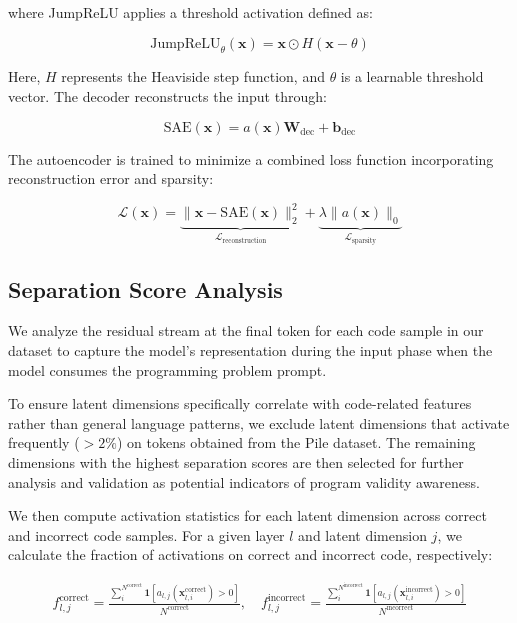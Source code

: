 where JumpReLU applies a threshold activation defined as:

\begin{equation}
    \text{JumpReLU}_\theta(\mathbf{x}) = \mathbf{x} \odot H(\mathbf{x} - \theta)
\end{equation}

Here, $H$ represents the Heaviside step function, and $\theta$ is a learnable threshold vector. The decoder reconstructs the input through:

\begin{equation}
    \text{SAE}(\mathbf{x})=a(\mathbf{x})\mathbf{W}_{\text{dec}}+\mathbf{b}_{\text{dec}}
\end{equation}

The autoencoder is trained to minimize a combined loss function incorporating reconstruction error and sparsity:

\begin{equation}
    \mathcal{L}(\mathbf{x}) = \underbrace{\|\mathbf{x} - \text{SAE}(\mathbf{x})\|_2^2}_{\mathcal{L}_{\text{reconstruction}}} + \underbrace{\lambda \|a(\mathbf{x})\|_0}_{\mathcal{L}_{\text{sparsity}}}
\end{equation}

\subsection{Separation Score Analysis}

We analyze the residual stream at the final token for each code sample in our dataset to capture the model's representation during the input phase when the model consumes the programming problem prompt. 

To ensure latent dimensions specifically correlate with code-related features rather than general language patterns, we exclude latent dimensions that activate frequently ($>2\%$) on tokens obtained from the Pile dataset. The remaining dimensions with the highest separation scores are then selected for further analysis and validation as potential indicators of program validity awareness.

We then compute activation statistics for each latent dimension across correct and incorrect code samples. For a given layer $l$ and latent dimension $j$, we calculate the fraction of activations on correct and incorrect code, respectively:

\begin{align}
    f_{l,j}^{\text{correct}} = \frac{\sum_{i}^{N^{\text{correct}}} \mathbf{1}[a_{l,j}(\mathbf{x}_{l,i}^{\text{correct}}) > 0]}{N^{\text{correct}}}, \quad   
    f_{l,j}^{\text{incorrect}} = \frac{\sum_{i}^{N^{\text{incorrect}}} \mathbf{1} [a_{l,j}(\mathbf{x}_{l,i}^{\text{incorrect}}) > 0]}{N^{\text{incorrect}}}
\end{align}

